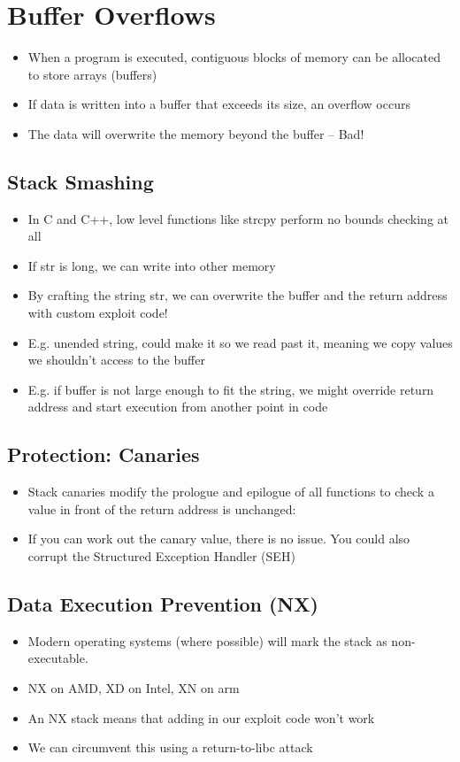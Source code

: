 \documentclass{article}
\begin{document}
\tableofcontents

\newpage

\section{Buffer Overflows}
\begin{itemize}
  \item When a program is executed, contiguous blocks of memory can be allocated to store arrays (buffers) 
  \item If data is written into a buffer that exceeds its size, an overflow occurs 
  \item The data will overwrite the memory beyond the buffer – Bad!
\end{itemize}

\subsection{Stack Smashing}
\begin{itemize}
  \item In C and C++, low level functions like strcpy perform no bounds checking at all 
  \item If str is long, we can write into other memory
  \item By crafting the string str, we can overwrite the buffer and the return address with custom exploit code!
  \item E.g. unended string, could make it so we read past it, meaning we copy values we shouldn't access to the buffer
  \item E.g. if buffer is not large enough to fit the string, we might override return address and start execution from another point in code
\end{itemize}

\subsection{Protection: Canaries}
\begin{itemize}
  \item Stack canaries modify the prologue and epilogue of all functions to check a value in front of the return address is unchanged:
  \item If you can work out the canary value, there is no issue. You could also corrupt the Structured Exception Handler (SEH)
\end{itemize}

\subsection{Data Execution Prevention (NX)}
\begin{itemize}
  \item Modern operating systems (where possible) will mark the stack as non-executable. 
  \item NX on AMD, XD on Intel, XN on arm 
  \item An NX stack means that adding in our exploit code won’t work 
  \item We can circumvent this using a return-to-libc attack
\end{itemize}
\end{document}
